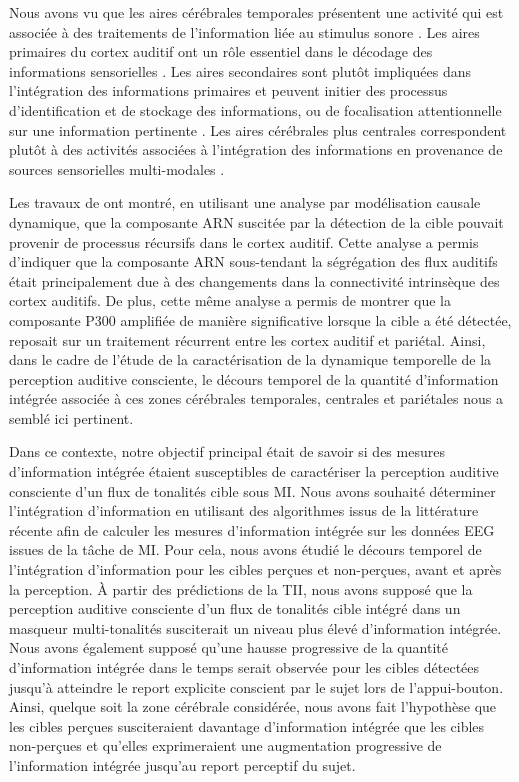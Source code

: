 Nous avons vu que les aires cérébrales temporales présentent une activité qui est associée à des traitements de l'information liée au stimulus sonore \citep{bidet2007mecanismes, micheyl2007role}. 
Les aires primaires du cortex auditif ont un rôle essentiel dans le décodage des informations sensorielles \citep{bidet2007mecanismes}. 
Les aires secondaires sont plutôt impliquées dans l'intégration des informations primaires et peuvent initier des processus d'identification et de stockage des informations, ou de focalisation attentionnelle sur une information pertinente \citep{hasselmann2017codage, lorenzi2016audition}. 
Les aires cérébrales plus centrales correspondent plutôt à des activités associées à l'intégration des informations en provenance de sources sensorielles multi-modales \citep{dehaene2006conscious, del2007brain}. 

Les travaux de \cite{giani2015detecting} ont montré, en utilisant une analyse par modélisation causale dynamique, que la composante ARN suscitée par la détection de la cible pouvait provenir de processus récursifs dans le cortex auditif. 
Cette analyse a permis d'indiquer que la composante ARN sous-tendant la ségrégation des flux auditifs était principalement due à des changements dans la connectivité intrinsèque des cortex auditifs. 
De plus, cette même analyse a permis de montrer que la composante P300 amplifiée de manière significative lorsque la cible a été détectée, reposait sur un traitement récurrent entre les cortex auditif et pariétal. 
Ainsi, dans le cadre de l'étude de la caractérisation de la dynamique temporelle de la perception auditive consciente, le décours temporel de la quantité d'information intégrée associée à ces zones cérébrales temporales, centrales et pariétales nous a semblé ici pertinent. 

Dans ce contexte, notre objectif principal était de savoir si des mesures d’information intégrée étaient susceptibles de caractériser la perception auditive consciente d’un flux de tonalités cible sous MI. 
Nous avons souhaité déterminer l'intégration d'information en utilisant des algorithmes issus de la littérature récente afin de calculer les mesures d'information intégrée sur les données EEG issues de la tâche de MI. 
Pour cela, nous avons étudié le décours temporel de l’intégration d’information pour les cibles perçues et non-perçues, avant et après la perception. 
À partir des prédictions de la TII, nous avons supposé que la perception auditive consciente d'un flux de tonalités cible intégré dans un masqueur multi-tonalités susciterait un niveau plus élevé d'information intégrée. 
Nous avons également supposé qu'une hausse progressive de la quantité d'information intégrée dans le temps serait observée pour les cibles détectées jusqu'à atteindre le report explicite conscient par le sujet lors de l'appui-bouton.
Ainsi, quelque soit la zone cérébrale considérée, nous avons fait l'hypothèse que les cibles perçues susciteraient davantage d'information intégrée que les cibles non-perçues et qu'elles exprimeraient une augmentation progressive de l'information intégrée jusqu'au report perceptif du sujet. 

